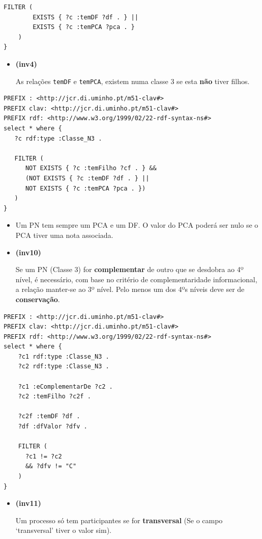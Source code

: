 \documentclass[tikz,runningheads,a4paper]{llncs}
\begin{document}
\begin{subappendices}
\begin{lstlisting}[language=sparql, frame=single, basicstyle=\scriptsize]
    FILTER (
        EXISTS { ?c :temDF ?df . } ||
        EXISTS { ?c :temPCA ?pca . }
    )
}
\end{lstlisting}

\begin{itemize}
\tightlist
\item
  \hypertarget{inv4}{\textbf{(inv4)}} As relações \texttt{temDF} e \texttt{temPCA}, existem
  numa classe 3 se esta \textbf{não} tiver filhos.
\end{itemize}

\begin{lstlisting}[language=sparql, frame=single, basicstyle=\scriptsize]
PREFIX : <http://jcr.di.uminho.pt/m51-clav#>
PREFIX clav: <http://jcr.di.uminho.pt/m51-clav#>
PREFIX rdf: <http://www.w3.org/1999/02/22-rdf-syntax-ns#>
select * where {
   ?c rdf:type :Classe_N3 .
   
   FILTER (
      NOT EXISTS { ?c :temFilho ?cf . } &&
      (NOT EXISTS { ?c :temDF ?df . } ||
      NOT EXISTS { ?c :temPCA ?pca . })
   )
}
\end{lstlisting}

\begin{itemize}
\tightlist
\item
  Um PN tem sempre um PCA e um DF. O valor do PCA poderá ser nulo se o
  PCA tiver uma nota associada.
\item
  \hypertarget{inv10}{\textbf{(inv10)}} Se um PN (Classe 3) for \textbf{complementar} de
  outro que se desdobra ao 4º nível, é necessário, com base no critério
  de complementaridade informacional, a relação manter-se ao 3º nível.
  Pelo menos um dos 4ºs níveis deve ser de \textbf{conservação}.
\end{itemize}

\begin{lstlisting}[language=sparql, frame=single, basicstyle=\scriptsize]
PREFIX : <http://jcr.di.uminho.pt/m51-clav#>
PREFIX clav: <http://jcr.di.uminho.pt/m51-clav#>
PREFIX rdf: <http://www.w3.org/1999/02/22-rdf-syntax-ns#>
select * where {
    ?c1 rdf:type :Classe_N3 .
    ?c2 rdf:type :Classe_N3 .

    ?c1 :eComplementarDe ?c2 .
    ?c2 :temFilho ?c2f .

    ?c2f :temDF ?df .
    ?df :dfValor ?dfv .

    FILTER (
      ?c1 != ?c2
      && ?dfv != "C"
    )
}
\end{lstlisting}

\begin{itemize}
\tightlist
\item
  \hypertarget{inv11}{\textbf{(inv11)}} Um processo só tem participantes se for
  \textbf{transversal} (Se o campo `transversal' tiver o valor sim).
\end{itemize}


\end{subappendices}
\end{document}
